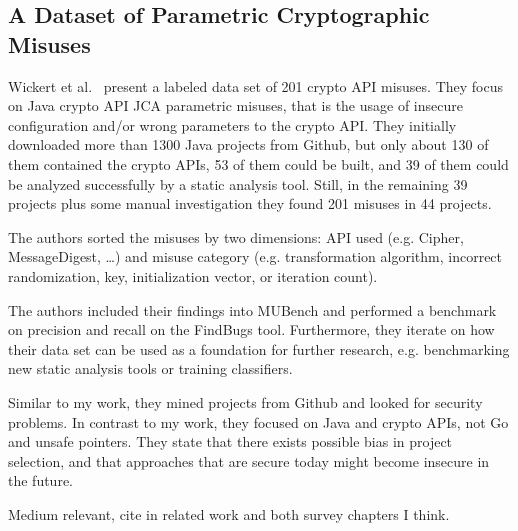 
\subsection{A Dataset of Parametric Cryptographic Misuses}
\label{subsec:a-dataset-of-parametric-cryptographic-misuses}

Wickert et al.~\cite{wickert2019} present a labeled data set of 201 crypto API misuses.
They focus on Java crypto API JCA parametric misuses, that is the usage of insecure configuration and/or wrong
parameters to the crypto API.
They initially downloaded more than 1300 Java projects from Github, but only about 130 of them contained the crypto
APIs, 53 of them could be built, and 39 of them could be analyzed successfully by a static analysis tool.
Still, in the remaining 39 projects plus some manual investigation they found 201 misuses in 44 projects.

The authors sorted the misuses by two dimensions: API used (e.g. Cipher, MessageDigest, \ldots) and misuse category (e.g.
transformation algorithm, incorrect randomization, key, initialization vector, or iteration count).

The authors included their findings into MUBench and performed a benchmark on precision and recall on the FindBugs tool.
Furthermore, they iterate on how their data set can be used as a foundation for further research, e.g. benchmarking new
static analysis tools or training classifiers.

Similar to my work, they mined projects from Github and looked for security problems.
In contrast to my work, they focused on Java and crypto APIs, not Go and unsafe pointers.
They state that there exists possible bias in project selection, and that approaches that are secure today might become
insecure in the future.

Medium relevant, cite in related work and both survey chapters I think.

